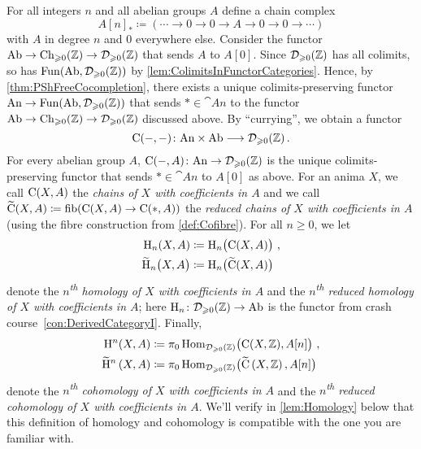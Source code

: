 \begin{con}\label{con:Homology}
	For all integers $n$ and all abelian groups $A$ define a chain complex
	\begin{equation*}
		A[n]_*\coloneqq \left(\dotsb\rightarrow 0\rightarrow 0\rightarrow A\rightarrow 0\rightarrow 0\rightarrow \dotsb\right)
	\end{equation*}
	with $A$ in degree $n$ and $0$ everywhere else. Consider the functor $\mathrm{Ab}\rightarrow\operatorname{Ch}_{\geqslant 0}(\mathbb{Z})\rightarrow\mathcal{D}_{\geqslant 0}(\mathbb{Z})$ that sends $A$ to $A[0]$. Since $\mathcal{D}_{\geqslant 0}(\mathbb{Z})$ has all colimits, so has $\operatorname{Fun}(\mathrm{Ab},\mathcal{D}_{\geqslant 0}(\mathbb{Z}))$ by \cref{lem:ColimitsInFunctorCategories}. Hence, by \cref{thm:PShFreeCocompletion}, there exists a unique colimits-preserving functor $\mathrm{An}\rightarrow\operatorname{Fun}(\mathrm{Ab},\mathcal{D}_{\geqslant 0}(\mathbb{Z}))$ that sends $*\in\cat{An}$ to the functor $\mathrm{Ab}\rightarrow\operatorname{Ch}_{\geqslant 0}(\mathbb{Z})\rightarrow\mathcal{D}_{\geqslant 0}(\mathbb{Z})$ discussed above. By \enquote{currying}, we obtain a functor
	\begin{equation*}
		\operatorname{C}(-,-)\colon \mathrm{An}\times\mathrm{Ab}\longrightarrow \mathcal{D}_{\geqslant 0}(\mathbb{Z})\,.
	\end{equation*} 
	For every abelian group $A$, $\operatorname{C}(-,A)\colon \mathrm{An}\rightarrow\mathcal{D}_{\geqslant 0}(\mathbb{Z})$ is the unique colimits-preserving functor that sends $*\in\cat{An}$ to $A[0]$ as above. For an anima $X$, we call $\operatorname{C}(X,A)$ the \emph{chains of $X$ with coefficients in $A$} and we call $\widetilde{\operatorname{C}}(X,A)\coloneqq \operatorname{fib}(\operatorname{C}(X,A)\rightarrow\operatorname{C}(*,A))$ the \emph{reduced chains of $X$ with coefficients in $A$} (using the fibre construction from \cref{def:Cofibre}). For all $n\geqslant 0$, we let
	\begin{align*}
		\H_n\!\left(X,A\right)&\coloneqq \H_n\lef(\C(X,A)\righ)\,,\\
		\widetilde{\H}_n\lef(X,A\righ)&\coloneqq\H_n\bigl(\widetilde{\C}(X,A)\bigr)
	\end{align*}
	denote the \emph{$n$\textsuperscript{th} homology of $X$ with coefficients in $A$} and the \emph{$n$\textsuperscript{th} reduced homology of $X$ with coefficients in $A$}; here $\mathrm{H}_n\colon \mathcal{D}_{\geqslant 0}(\mathbb{Z})\rightarrow\mathrm{Ab}$ is the functor from crash course~\cref{con:DerivedCategoryI}. Finally,
	\begin{align*}
		\H^n\!\left(X,A\right)&\coloneqq \pi_0\Hom_{\Dd_{\geqslant 0}(\IZ)}\lef(\C(X,\IZ),A[n]\righ)\,,\\ \widetilde{\H}^n\left(X,A\right)&\coloneqq \pi_0\Hom_{\Dd_{\geqslant 0}(\IZ)}\bigl(\widetilde{\C}\left(X,\IZ\right),A[n]\bigr)%
	\end{align*}
	denote the \emph{$n$\textsuperscript{th} cohomology of $X$ with coefficients in $A$} and the \emph{$n$\textsuperscript{th} reduced cohomology of $X$ with coefficients in $A$}. We'll verify in \cref{lem:Homology} below that this definition of homology and cohomology is compatible with the one you are familiar with.
	

\end{con}
